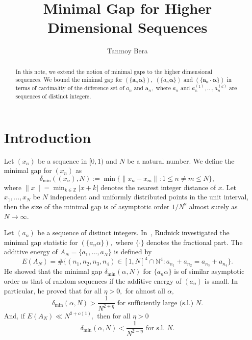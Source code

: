 \documentclass[12pt,article]{amsart}
\theoremstyle{remark}
\numberwithin{equation}{section}
\newcommand{\Z}{\mathbb{Z}}
\newcommand{\N}{\mathbb{N}}
\newcommand{\boldn}{\boldsymbol{n}}
\newcommand{\bolda}{\boldsymbol{a}}
\newcommand{\boldalpha}{\boldsymbol{\alpha}}
\begin{document}
	
	\title[Minimal Gap for Higher Dimensional Sequences]{Minimal Gap for Higher Dimensional Sequences}
	
	\author{Tanmoy Bera}
	\address{The Institute of Mathematical Sciences, A CI of 
		Homi Bhabha National Institute, CIT Campus, Taramani, Chennai
		600113, India.}
	
	
	
	\maketitle
	\begin{abstract}
		In this note, we extend the notion of minimal gaps to the higher dimensional sequences. We bound the minimal gap for $(\{\bolda_n\boldalpha\}),$ $(\{a_n\boldalpha\})$ and $(\{\bolda_n\cdot\boldalpha\})$ in terms of cardinality of the difference set of $a_n$ and $\bolda_n,$ where $a_n$ and $a_n^{(1)},\dots,a_n^{(d)}$ are sequences of distinct integers. 
	\end{abstract}
	
	\section{Introduction}
	Let $(x_n)$ be a sequence in $[0,1)$ and $N$ be a natural number. We define the minimal gap for $(x_n)$ as
	\[\delta_{\text{min}}((x_n),N):=\min\{\|x_n-x_m\|:1\leq n\neq m\leq N\},\]
	where $\displaystyle\|x\|=\min_{k\in\Z}|x+k|$ denotes the nearest integer distance of $x.$
	Let $x_1,\dots,x_N$ be $N$ independent and uniformly distributed points in the unit interval, then the size of the minimal gap is of asymptotic order $1/N^2$ almost surely as $N\to \infty$.
	
	Let $(a_n)$ be a sequence of distinct integers. In~\cite{Rudnick2018minimalgap}, Rudnick investigated the minimal gap statistic for $(\{a_n\alpha\}),$ where $\{\cdot\}$ denotes the fractional part. The additive energy of $A_N=\{a_1,\dots,a_N\}$ is defined by
	\[E(A_N)=\#\{(n_1,n_2,n_3,n_4)\in[1,N]^4\cap\N^4: a_{n_1}+a_{n_2}=a_{n_3}+a_{n_4}\}.\] 
	He showed that the minimal gap $\delta_{\text{min}}(\alpha,N)$ for $\{a_n\alpha\}$ is of similar asymptotic order as that of random sequences if the additive energy of $(a_n)$ is small. In particular, he proved that 
	for all $\eta>0,$ for almost all $\alpha,$ $$\delta_{\text{min}}(\alpha,N)>\frac{1}{N^{2+\eta}}\text{ for sufficiently large (s.l.) } N.$$
	And, if
	$E(A_N)\ll N^{2+o(1)},$ then for all $\eta>0$
	$$\delta_{\text{min}}(\alpha,N)<\frac{1}{N^{2-\eta}}\text{ for s.l. }N.$$
	
\end{document}
